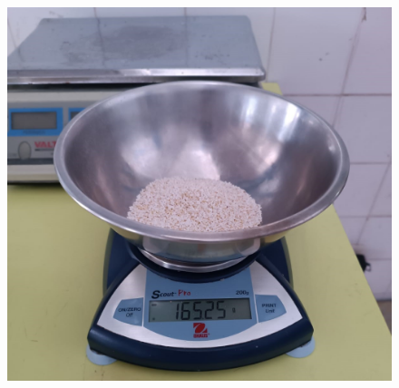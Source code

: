 \documentclass[manuscript,screen,review]{acmart}
\begin{document}
\begin{figure}[H]
          \begin{minipage}{0.48\linewidth}
            \centering
            \includegraphics[width=0.9\linewidth]{imagen/kiwicha.jpeg}
            

\end{minipage}
\end{figure}
\end{document}
